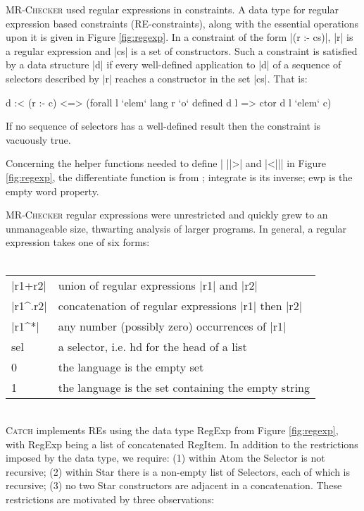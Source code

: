 \documentclass[preprint]{sigplanconf}
\newcommand{\C}[1]{\textsf{#1}}
\newcommand{\catch}{\textsc{Catch}}
\newcommand{\newtool}{\anon{\catch07}{\catch}}
\newcommand{\oldtool}{\anon{\catch05}{\textsc{MR-Checker}}}
\newcommand{\anon}[2]{#2}
\begin{document}
\oldtool{} used regular expressions in constraints. A data type for regular expression based constraints (RE-constraints), along with the essential operations upon it is given in Figure \ref{fig:regexp}. In a constraint of the form |(r :- cs)|, |r| is a regular expression and |cs| is a set of constructors. Such a constraint is satisfied by a data structure |d| if every well-defined application to |d| of a sequence of selectors described by |r| reaches a constructor in the set |cs|. That is:

\begin{code}
d :< (r :- c) <=> (forall l `elem` lang r `o` defined d l => ctor d l `elem` c)
\end{code}

If no sequence of selectors has a well-defined result then the constraint is vacuously true.

Concerning the helper functions needed to define | ||>| and |<||| in Figure \ref{fig:regexp}, the \C{differentiate} function is from \citet{conway:regexp}; \C{integrate} is its inverse; \C{ewp} is the empty word property.

\oldtool{} regular expressions were unrestricted and quickly grew to an unmanageable size, thwarting analysis of larger programs. In general, a regular expression takes one of six forms:\\ \\
\begin{tabular}{ll}
|r1+r2|  & union of regular expressions |r1| and |r2| \\
|r1^.r2| & concatenation of regular expressions |r1| then |r2| \\
|r1^*|   & any number (possibly zero) occurrences of |r1| \\
\C{sel}  & a selector, i.e. \C{hd} for the head of a list \\
0        & the language is the empty set \\
1        & the language is the set containing the empty string
\end{tabular} \\

\newtool{} implements REs using the data type \C{RegExp} from Figure \ref{fig:regexp}, with \C{RegExp} being a list of concatenated \C{RegItem}. In addition to the restrictions imposed by the data type, we require: (1) within \C{Atom} the \C{Selector} is not recursive; (2) within \C{Star} there is a non-empty list of \C{Selector}s, each of which is recursive; (3) no two \C{Star} constructors are adjacent in a concatenation. These restrictions are motivated by three observations:
\end{document}
